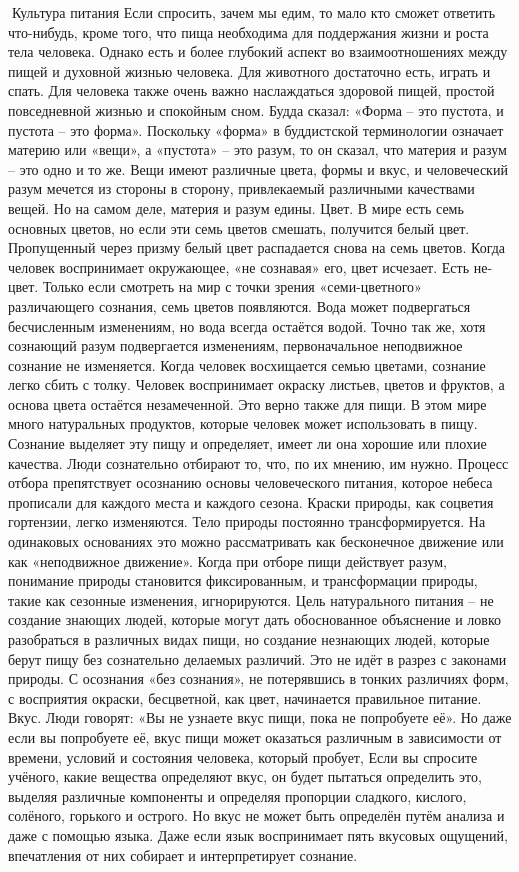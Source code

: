 \documentclass[a4paper]{book}
\begin{document}
Культура питания
Если спросить, зачем мы едим, то мало кто сможет ответить что-нибудь, кроме того, что
пища необходима для поддержания жизни и роста тела человека. Однако есть и более
глубокий аспект во взаимоотношениях между пищей и духовной жизнью человека. Для
животного достаточно есть, играть и спать. Для человека также очень важно наслаждаться
здоровой пищей, простой повседневной жизнью и спокойным сном.
Будда сказал: «Форма – это пустота, и пустота – это форма». Поскольку «форма» в
буддистской терминологии означает материю или «вещи», а «пустота» – это разум, то он
сказал, что материя и разум – это одно и то же. Вещи имеют различные цвета, формы и вкус,
и человеческий разум мечется из стороны в сторону, привлекаемый различными качествами
вещей. Но на самом деле, материя и разум едины.
Цвет. В мире есть семь основных цветов, но если эти семь цветов смешать, получится
белый цвет. Пропущенный через призму белый цвет распадается снова на семь цветов. Когда
человек воспринимает окружающее, «не сознавая» его, цвет исчезает. Есть не-цвет. Только
если смотреть на мир с точки зрения «семи-цветного» различающего сознания, семь цветов
появляются. Вода может подвергаться бесчисленным изменениям, но вода всегда остаётся
водой. Точно так же, хотя сознающий разум подвергается изменениям, первоначальное
неподвижное сознание не изменяется. Когда человек восхищается семью цветами, сознание
легко сбить с толку. Человек воспринимает окраску листьев, цветов и фруктов, а основа
цвета остаётся незамеченной.
Это верно также для пищи. В этом мире много натуральных продуктов, которые человек
может использовать в пищу. Сознание выделяет эту пищу и определяет, имеет ли она
хорошие или плохие качества. Люди сознательно отбирают то, что, по их мнению, им нужно.
Процесс отбора препятствует осознанию основы человеческого питания, которое небеса
прописали для каждого места и каждого сезона.
Краски природы, как соцветия гортензии, легко изменяются. Тело природы постоянно
трансформируется. На одинаковых основаниях это можно рассматривать как бесконечное
движение или как «неподвижное движение». Когда при отборе пищи действует разум,
понимание природы становится фиксированным, и трансформации природы, такие как
сезонные изменения, игнорируются.
Цель натурального питания – не создание знающих людей, которые могут дать
обоснованное объяснение и ловко разобраться в различных видах пищи, но создание
незнающих людей, которые берут пищу без сознательно делаемых различий. Это не идёт в
разрез с законами природы. С осознания «без сознания», не потерявшись в тонких различиях
форм, с восприятия окраски, бесцветной, как цвет, начинается правильное питание.
Вкус. Люди говорят: «Вы не узнаете вкус пищи, пока не попробуете её». Но даже если
вы попробуете её, вкус пищи может оказаться различным в зависимости от времени, условий
и состояния человека, который пробует,
Если вы спросите учёного, какие вещества определяют вкус, он будет пытаться
определить это, выделяя различные компоненты и определяя пропорции сладкого, кислого,
солёного, горького и острого. Но вкус не может быть определён путём анализа и даже с
помощью языка. Даже если язык воспринимает пять вкусовых ощущений, впечатления от
них собирает и интерпретирует сознание.
\end{document}
